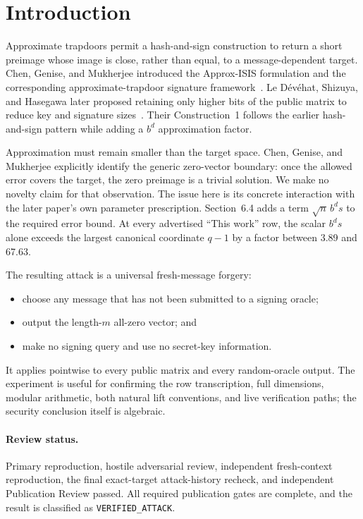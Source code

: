 \documentclass[10pt,a4paper]{article}
\begin{document}
\section{Introduction}

Approximate trapdoors permit a hash-and-sign construction to return a short
preimage whose image is close, rather than equal, to a message-dependent
target. Chen, Genise, and Mukherjee introduced the Approx-ISIS formulation and
the corresponding approximate-trapdoor signature framework~\cite{cgm}. Le
Dévéhat, Shizuya, and Hasegawa later proposed retaining only higher bits of the
public matrix to reduce key and signature sizes~\cite{hbaisis}. Their
Construction~1 follows the earlier hash-and-sign pattern while adding a
$b^d$ approximation factor.

Approximation must remain smaller than the target space. Chen, Genise, and
Mukherjee explicitly identify the generic zero-vector boundary: once the
allowed error covers the target, the zero preimage is a trivial solution. We
make no novelty claim for that observation. The issue here is its concrete
interaction with the later paper's own parameter prescription. Section~6.4
adds a term $\sqrt n\,b^d s$ to the required error bound. At every advertised
``This work'' row, the scalar $b^d s$ alone exceeds the largest canonical
coordinate $q-1$ by a factor between 3.89 and 67.63.

The resulting attack is a universal fresh-message forgery:
\begin{itemize}
  \item choose any message that has not been submitted to a signing oracle;
  \item output the length-$m$ all-zero vector; and
  \item make no signing query and use no secret-key information.
\end{itemize}
It applies pointwise to every public matrix and every random-oracle output.
The experiment is useful for confirming the row transcription, full
dimensions, modular arithmetic, both natural lift conventions, and live
verification paths; the security conclusion itself is algebraic.

\paragraph{Review status.}
Primary reproduction, hostile adversarial review, independent fresh-context
reproduction, the final exact-target attack-history recheck, and independent
Publication Review passed. All required publication gates are complete, and
the result is classified as \texttt{VERIFIED\_ATTACK}.
\end{document}
